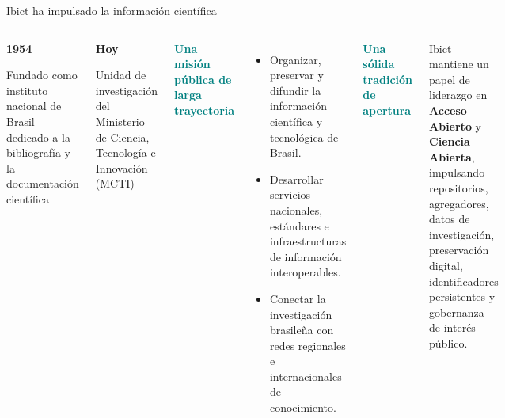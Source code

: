 \documentclass[aspectratio=169,11pt]{beamer}
\newcommand{\tagline}[1]{\textcolor{Teal}{\bfseries\small#1}}
\begin{document}
\begin{frame}{Ibict ha impulsado la información científica}
  \begin{columns}[T,onlytextwidth]
      \vspace{0.10cm}
      \begin{center}
        {\fontsize{42}{46}\selectfont\bfseries\color{Teal}1954}
        \vspace{0.18cm}

        {\small\color{Muted}Fundado como instituto nacional de Brasil dedicado a la bibliografía y la documentación científica}
      \end{center}
      \vspace{0.25cm}
      \colorbox{Mist}{\parbox{.90\linewidth}{\centering\small\textbf{Hoy}\par Unidad de investigación del Ministerio de Ciencia, Tecnología e Innovación (MCTI)}}
      \tagline{Una misión pública de larga trayectoria}
      \vspace{0.24cm}
      \begin{itemize}\setlength\itemsep{0.32cm}
        \item Organizar, preservar y difundir la información científica y tecnológica de Brasil.
        \item Desarrollar servicios nacionales, estándares e infraestructuras de información interoperables.
        \item Conectar la investigación brasileña con redes regionales e internacionales de conocimiento.
      \end{itemize}
      \vspace{0.22cm}
      \tagline{Una sólida tradición de apertura}\par
      \vspace{0.20cm}
      \small Ibict mantiene un papel de liderazgo en \textbf{Acceso Abierto} y \textbf{Ciencia Abierta}, impulsando repositorios, agregadores, datos de investigación, preservación digital, identificadores persistentes y gobernanza de interés público.
  \end{columns}
\end{frame}
\end{document}
